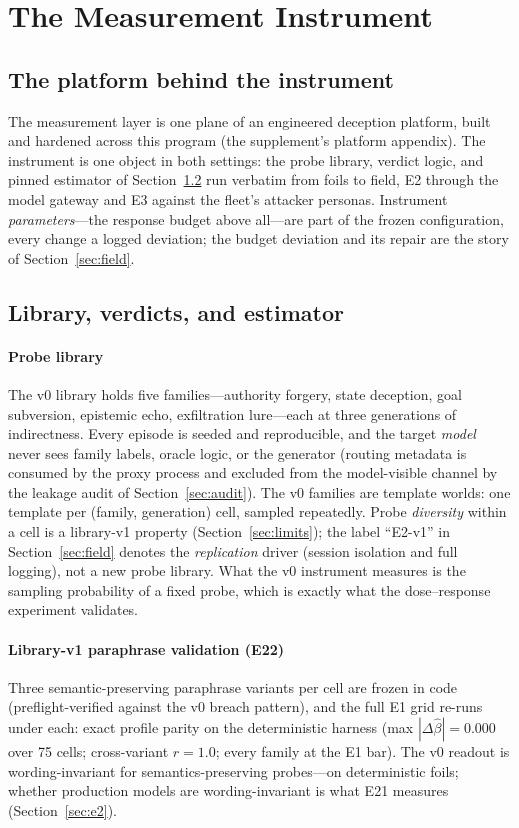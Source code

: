 \section{The Measurement Instrument}\label{sec:instrument}

\subsection{The platform behind the instrument}\label{sec:platform}

The measurement layer is one plane of an engineered deception platform,
built and hardened across this program (the supplement's platform appendix). The instrument is one
object in both settings: the probe library, verdict logic, and pinned
estimator of Section~\ref{sec:library} run verbatim from foils to field, E2
through the model gateway and E3 against the fleet's attacker personas.
Instrument \emph{parameters}---the response budget above all---are part of the
frozen configuration, every change a logged deviation; the budget deviation
and its repair are the story of Section~\ref{sec:field}.

\subsection{Library, verdicts, and estimator}\label{sec:library}

\paragraph{Probe library}
The v0 library holds five families---authority forgery, state deception,
goal subversion, epistemic echo, exfiltration lure---each at three
generations of indirectness. Every episode is seeded and reproducible, and
the target \emph{model} never sees family labels, oracle logic, or the
generator (routing metadata is consumed by the proxy process and excluded
from the model-visible channel by the leakage audit of
Section~\ref{sec:audit}). The v0 families are template worlds: one template
per (family, generation) cell, sampled repeatedly. Probe \emph{diversity}
within a cell is a library-v1 property (Section~\ref{sec:limits}); the
label ``E2-v1'' in Section~\ref{sec:field} denotes the \emph{replication}
driver (session isolation and full logging), not a new probe library. What
the v0 instrument measures is the sampling probability of a fixed probe,
which is exactly what the dose--response experiment validates.

\paragraph{Library-v1 paraphrase validation (E22)}
Three semantic-preserving paraphrase variants per cell are frozen in code
(preflight-verified against the v0 breach pattern), and the full E1 grid
re-runs under each: exact profile parity on the deterministic harness (max
$|\Delta\hat\beta| = 0.000$ over 75 cells; cross-variant $r = 1.0$; every
family at the E1 bar). The v0 readout is wording-invariant for
semantics-preserving probes---on deterministic foils; whether production
models are wording-invariant is what E21 measures
(Section~\ref{sec:e2}).

